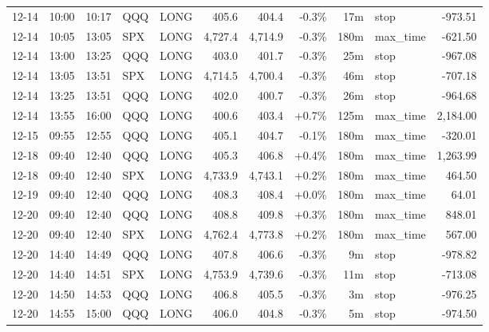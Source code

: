 \documentclass[11pt,a4paper,twoside]{article}
\begin{document}
\begin{center}
\begin{longtable}{>{\color{txtmain}}l l l l l r r r r >{\color{txtmain}}l r}
12-14 & 10:00 & 10:17 & QQQ & LONG & 405.6 & 404.4 & \textcolor{lossred}{-0.3\%} & 17m & stop & \textcolor{lossred}{-973.51} \\
12-14 & 10:05 & 13:05 & SPX & LONG & 4,727.4 & 4,714.9 & \textcolor{lossred}{-0.3\%} & 180m & max\_time & \textcolor{lossred}{-621.50} \\
12-14 & 13:00 & 13:25 & QQQ & LONG & 403.0 & 401.7 & \textcolor{lossred}{-0.3\%} & 25m & stop & \textcolor{lossred}{-967.08} \\
12-14 & 13:05 & 13:51 & SPX & LONG & 4,714.5 & 4,700.4 & \textcolor{lossred}{-0.3\%} & 46m & stop & \textcolor{lossred}{-707.18} \\
12-14 & 13:25 & 13:51 & QQQ & LONG & 402.0 & 400.7 & \textcolor{lossred}{-0.3\%} & 26m & stop & \textcolor{lossred}{-964.68} \\
12-14 & 13:55 & 16:00 & QQQ & LONG & 400.6 & 403.4 & \textcolor{wingreen}{+0.7\%} & 125m & max\_time & \textcolor{wingreen}{2,184.00} \\
12-15 & 09:55 & 12:55 & QQQ & LONG & 405.1 & 404.7 & \textcolor{lossred}{-0.1\%} & 180m & max\_time & \textcolor{lossred}{-320.01} \\
12-18 & 09:40 & 12:40 & QQQ & LONG & 405.3 & 406.8 & \textcolor{wingreen}{+0.4\%} & 180m & max\_time & \textcolor{wingreen}{1,263.99} \\
12-18 & 09:40 & 12:40 & SPX & LONG & 4,733.9 & 4,743.1 & \textcolor{wingreen}{+0.2\%} & 180m & max\_time & \textcolor{wingreen}{464.50} \\
12-19 & 09:40 & 12:40 & QQQ & LONG & 408.3 & 408.4 & \textcolor{wingreen}{+0.0\%} & 180m & max\_time & \textcolor{wingreen}{64.01} \\
12-20 & 09:40 & 12:40 & QQQ & LONG & 408.8 & 409.8 & \textcolor{wingreen}{+0.3\%} & 180m & max\_time & \textcolor{wingreen}{848.01} \\
12-20 & 09:40 & 12:40 & SPX & LONG & 4,762.4 & 4,773.8 & \textcolor{wingreen}{+0.2\%} & 180m & max\_time & \textcolor{wingreen}{567.00} \\
12-20 & 14:40 & 14:49 & QQQ & LONG & 407.8 & 406.6 & \textcolor{lossred}{-0.3\%} & 9m & stop & \textcolor{lossred}{-978.82} \\
12-20 & 14:40 & 14:51 & SPX & LONG & 4,753.9 & 4,739.6 & \textcolor{lossred}{-0.3\%} & 11m & stop & \textcolor{lossred}{-713.08} \\
12-20 & 14:50 & 14:53 & QQQ & LONG & 406.8 & 405.5 & \textcolor{lossred}{-0.3\%} & 3m & stop & \textcolor{lossred}{-976.25} \\
12-20 & 14:55 & 15:00 & QQQ & LONG & 406.0 & 404.8 & \textcolor{lossred}{-0.3\%} & 5m & stop & \textcolor{lossred}{-974.50} \\

\end{longtable}
\end{center}
\end{document}
